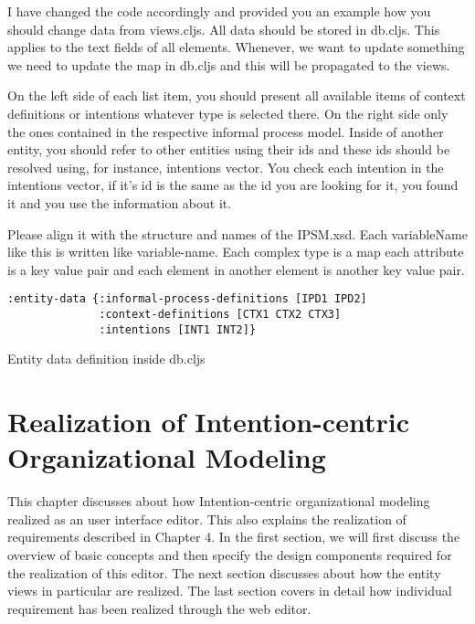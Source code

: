 I have changed the code accordingly and provided you an example how you should change data from views.cljs. All data should be stored in db.cljs. This applies to the text fields of all elements. Whenever, we want to update something we need to update the map in db.cljs and this will be propagated to the views.


On the left side of each list item, you should present all available items of context definitions or intentions whatever type is selected there. On the right side only the ones contained in the respective informal process model. Inside of another entity, you should refer to other entities using their ids and these ids should be resolved using, for instance, intentions vector. You check each intention in the intentions vector, if it’s id is the same as the id you are looking for it, you found it and you use the information about it.  


Please align it with the structure and names of the IPSM.xsd. Each variableName like this is written like variable-name. Each complex type is a map each attribute is a key value pair and each element in another element is another key value pair.

\begin{Listing}
	\begin{lstlisting}
:entity-data {:informal-process-definitions [IPD1 IPD2]
	          :context-definitions [CTX1 CTX2 CTX3]
	          :intentions [INT1 INT2]} 
	\end{lstlisting}
	\caption{Entity data definition inside db.cljs}
	\label{lst:entitydatalist}
\end{Listing}

\section{Realization of Intention-centric Organizational Modeling}
\label{sec:realization}

\hspace{4ex} This chapter discusses about how Intention-centric organizational modeling realized as an user interface editor. This also explains the realization of requirements described in Chapter 4. In the first section, we will first discuss the overview of basic concepts and then specify the design components required for the realization of this editor. The next section discusses about how the entity views in particular are realized. The last section covers in detail how individual requirement has been realized through the web editor.


